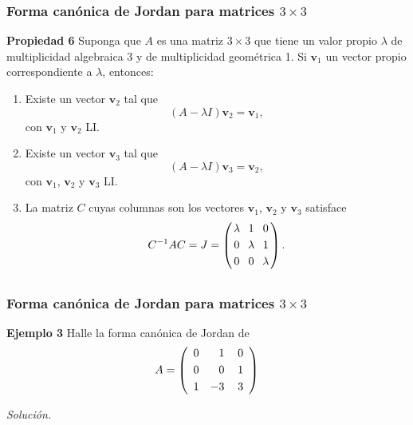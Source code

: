 {\nologo 
\begin{frame}\frametitle{Forma canónica de Jordan para matrices $3\times 3$}
	
	\vspace{-2mm}	
	\begin{prop}{\textbf{Propiedad 6}}\justifying
		Suponga que $A$ es una matriz $3\times 3$ que tiene un valor propio $\lambda$ de multiplicidad 
		algebraica 3 y de multiplicidad geométrica 1. Si $\mathbf{v}_1$ un vector propio correspondiente a
		$\lambda$, entonces:
		\begin{enumerate}[$a$]
			\item Existe un vector $\mathbf{v}_2$ tal que 
			\[
				(A-\lambda I) \mathbf{v}_2 = \mathbf{v}_1,
			\]
			con $\mathbf{v}_1$ y $\mathbf{v}_2$ LI.
			\item Existe un vector $\mathbf{v}_3$ tal que 
			\[
			(A-\lambda I) \mathbf{v}_3 = \mathbf{v}_2,
			\]
			con $\mathbf{v}_1$, $\mathbf{v}_2$ y $\mathbf{v}_3$ LI.
			\item La matriz $C$ cuyas columnas son los vectores $\mathbf{v}_1$, $\mathbf{v}_2$ y $\mathbf{v}_3$ satisface
			\[
			C^{-1} A C = J =
			\left(
			\begin{array}{@{\hspace{0.2\tabcolsep}}c@{\hspace{1.2\tabcolsep}}c@{\hspace{1.2\tabcolsep}}c@{\hspace{0.2\tabcolsep}}}
				\lambda & 1  & 0 \\[1mm]
				0 & \lambda  & 1 \\[1mm]
				0 & 0  & \lambda
			\end{array}
			\right).
			\]
		\end{enumerate}
				
	\end{prop}
	
\end{frame}
}


\subsection{}

\begin{frame}\frametitle{Forma canónica de Jordan para matrices $3\times 3$}
	
	\begin{ej}{\textbf{Ejemplo 3}} \justifying
		Halle la forma canónica de Jordan de
		\[
		A = 
		\left(
		\begin{array}{cr@{\hspace{2\tabcolsep}}r}
			0 &  1 & 0 \\[1mm]
			0 &  0 & 1 \\[1mm]
			1 & -3 & 3
		\end{array}
		\right)
		\]
	\end{ej}
	
	\textit{Solución.}	
	
\end{frame}